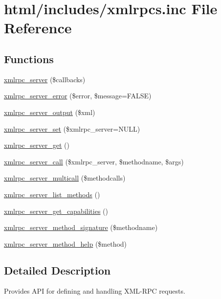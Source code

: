 \hypertarget{xmlrpcs_8inc}{
\section{html/includes/xmlrpcs.inc File Reference}
\label{xmlrpcs_8inc}
}
\subsection*{Functions}
\begin{DoxyCompactItemize}
\item 
\hyperlink{xmlrpcs_8inc_aff1b954dfb418c8c13f2432e15a86dab}{xmlrpc\_\-server} (\$callbacks)
\item 
\hyperlink{xmlrpcs_8inc_a749a40314f46082a5106ad7d1d168cf0}{xmlrpc\_\-server\_\-error} (\$error, \$message=FALSE)
\item 
\hyperlink{xmlrpcs_8inc_ae06ded93094adefd59479489022b726a}{xmlrpc\_\-server\_\-output} (\$xml)
\item 
\hyperlink{xmlrpcs_8inc_a0797ab88a9029962cd404475d1dfd253}{xmlrpc\_\-server\_\-set} (\$xmlrpc\_\-server=NULL)
\item 
\hyperlink{xmlrpcs_8inc_a368b9f8580aad3b04ad06387e0042b1d}{xmlrpc\_\-server\_\-get} ()
\item 
\hyperlink{xmlrpcs_8inc_a892eae4961430f05ba83b9e1cf522485}{xmlrpc\_\-server\_\-call} (\$xmlrpc\_\-server, \$methodname, \$args)
\item 
\hyperlink{xmlrpcs_8inc_ae1cd0e09d695aef0363147fbd6091a76}{xmlrpc\_\-server\_\-multicall} (\$methodcalls)
\item 
\hyperlink{xmlrpcs_8inc_a2f1b58cbb48ecb760adc16ca381aa589}{xmlrpc\_\-server\_\-list\_\-methods} ()
\item 
\hyperlink{xmlrpcs_8inc_a4763d0e14c3c8eee618d47c8f8d7984f}{xmlrpc\_\-server\_\-get\_\-capabilities} ()
\item 
\hyperlink{xmlrpcs_8inc_a9b7ad314b1b3d3a70211bf6d7d30ea84}{xmlrpc\_\-server\_\-method\_\-signature} (\$methodname)
\item 
\hyperlink{xmlrpcs_8inc_a1a48f047591bd1d200db7bef20d5c5eb}{xmlrpc\_\-server\_\-method\_\-help} (\$method)
\end{DoxyCompactItemize}


\subsection{Detailed Description}
Provides API for defining and handling XML-\/RPC requests. 

